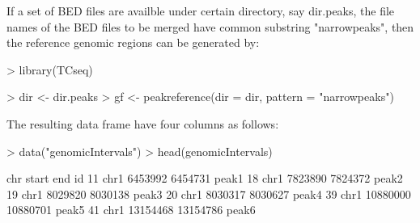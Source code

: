 \documentclass[a4paper]{article}
\begin{document}
If a set of BED files are availble under certain directory, say dir.peaks, the file names of the BED files to be merged have common substring "narrowpeaks", then the reference genomic regions can be generated by:
\begin{Schunk}
\begin{Sinput}
> library(TCseq)
\end{Sinput}
\end{Schunk}

\begin{Schunk}
\begin{Sinput}
> dir <- dir.peaks
> gf <- peakreference(dir = dir, pattern = "narrowpeaks")
\end{Sinput}
\end{Schunk}
The resulting data frame have four columns as follows:
\begin{Schunk}
\begin{Sinput}
> data("genomicIntervals")
> head(genomicIntervals)
\end{Sinput}
\begin{Soutput}
    chr    start      end    id
11 chr1  6453992  6454731 peak1
18 chr1  7823890  7824372 peak2
19 chr1  8029820  8030138 peak3
20 chr1  8030317  8030627 peak4
39 chr1 10880000 10880701 peak5
41 chr1 13154468 13154786 peak6
\end{Soutput}
\end{Schunk}
\end{document}
